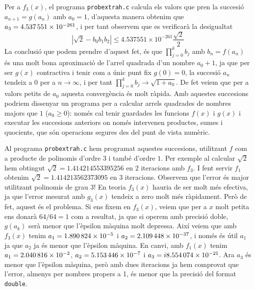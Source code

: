 \documentclass[12pt]{article}
\begin{document}
Per a $f_3(x)$, el programa \texttt{probextrah.c} calcula els valors que pren la succesió $a_{n+1}=g(a_n)$ amb $a_0=1$, d'aquesta manera obtenim que \( a_3 = \num{4.537551d-261} \), i per tant observem que es verificarà la desigualtat
	\begin{equation}
		|\sqrt{2}-b_0b_1b_2|\leq4.537551\times10^{-261}\frac{\sqrt{2}}{2}
	\end{equation}
	La conclusió que podem prendre d'aquest fet, és que $\prod_{j=0}^{k}b_j$ amb $b_n=f(a_n)$ és una molt bona aproximació de l'arrel quadrada d'un nombre $a_0+1$, ja que per ser $g(x)$ contractiva i tenir com a únic punt fix $g(0)=0$, la succesió $a_n$ tendeix a $0$ per a $n\to\infty$, i per tant $\prod_{j=0}^{k}b_j\to\sqrt{1+a_0}$. De fet veiem que per a valors petits de $a_0$ aquesta convergència és molt ràpida. Amb aquestes succesions podriem dissenyar un programa per a calcular arrels quadrades de nombres majors que $1$ ($a_0\geq0$): només cal tenir guardades les funcions $f(x)$ i $g(x)$ i executar les succesions anteriors on només intervenen productes, sumes i quocients, que són operacions segures des del punt de vista numèric. 
	
	Al programa \texttt{probextrah.c} hem programat aquestes succesions, utilitzant $f$ com a producte de polinomis d'ordre $3$ i també d'ordre $1$. Per exemple al calcular $\sqrt{2}$ hem obtingut $\sqrt{2}=\num{1.414214553395256}$ en $2$ iteracions amb $f_3$. I fent servir \( f_1 \) obtenim $\sqrt{2}=\num{1.414213562373095}$ en $3$ iteracions. Observem que l'error és major utilitzant polinomis de grau $3$! En teoria $f_3(x)$ hauria de ser molt més efectiva, ja que l'error mesurat amb $g_3(x)$ tendeix a zero molt més ràpidament. Però de fet, aquest és el problema. Si ens fixem en $f_3(x)$, veiem que per a $x$ molt petita ens donarà $64/64=1$ com a resultat, ja que si operem amb precisió doble, \( g(a_k) \) serà menor que l'èpsilon màquina molt depressa. Així veiem que amb $f_3(x)$ tenim $a_1= \num{1.890824d-5}$ i $a_2= \num{2.109448d-37}$, i només és útil $a_1$ ja que \( a_2 \) ja és menor que l'èpsilon màquina. En canvi, amb $f_1(x)$ tenim $a_1=\num{2.040816d-2}$, $a_2=\num{5.153446d-7}$ i $a_3=i\num{8.554074d-21}$. Ara \( a_3 \) és menor que l'èpsilon màquina, però amb dues iteracions ja hem comprovat que l'error, almenys per nombres propers a 1, és menor que la precisió del format \texttt{double}.
\end{document}
